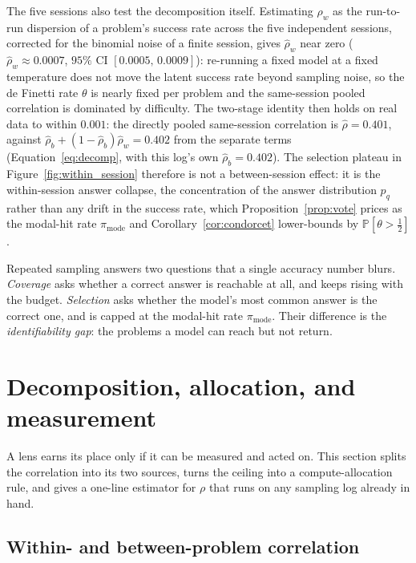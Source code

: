 \documentclass[11pt]{article}
\newcommand{\Prob}{\mathbb{P}}
\begin{document}
The five sessions also test the decomposition itself. Estimating $\rho_w$ as the run-to-run dispersion of a problem's success rate across the five independent sessions, corrected for the binomial noise of a finite session, gives $\hat\rho_w$ near zero ($\hat\rho_w \approx 0.0007$, $95\%$ CI $[0.0005,\,0.0009]$): re-running a fixed model at a fixed temperature does not move the latent success rate beyond sampling noise, so the de Finetti rate $\theta$ is nearly fixed per problem and the same-session pooled correlation is dominated by difficulty. The two-stage identity then holds on real data to within $0.001$: the directly pooled same-session correlation is $\hat\rho=0.401$, against $\hat\rho_b + (1-\hat\rho_b)\hat\rho_w = 0.402$ from the separate terms (Equation~\eqref{eq:decomp}, with this log's own $\hat\rho_b=0.402$). The selection plateau in Figure~\ref{fig:within_session} therefore is not a between-session effect: it is the within-session answer collapse, the concentration of the answer distribution $p_q$ rather than any drift in the success rate, which Proposition~\ref{prop:vote} prices as the modal-hit rate $\pi_{\mathrm{mode}}$ and Corollary~\ref{cor:condorcet} lower-bounds by $\Prob[\theta>\tfrac12]$.

\begin{takeaway}
Repeated sampling answers two questions that a single accuracy number blurs. \emph{Coverage} asks whether a correct answer is reachable at all, and keeps rising with the budget. \emph{Selection} asks whether the model's most common answer is the correct one, and is capped at the modal-hit rate $\pi_{\mathrm{mode}}$. Their difference is the \emph{identifiability gap}: the problems a model can reach but not return.
\end{takeaway}

\section{Decomposition, allocation, and measurement}
\label{sec:practice}

A lens earns its place only if it can be measured and acted on. This section splits the correlation into its two sources, turns the ceiling into a compute-allocation rule, and gives a one-line estimator for $\rho$ that runs on any sampling log already in hand.

\subsection{Within- and between-problem correlation}
\label{sec:decomp}
\end{document}
